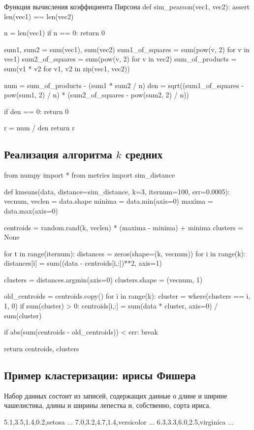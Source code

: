 \begin{pylst}{Функция вычисления коэффициента Пирсона}{}
def sim_pearson(vec1, vec2):
    assert len(vec1) == len(vec2)

    n = len(vec1)
    if n == 0:
        return 0

    sum1, sum2 = sum(vec1), sum(vec2)
    sum1_of_squares = sum(pow(v, 2) for v in vec1)
    sum2_of_squares = sum(pow(v, 2) for v in vec2)
    sum_of_products = sum(v1 * v2 for v1, v2 in zip(vec1, vec2))

    num = sum_of_products - (sum1 * sum2 / n)
    den = sqrt((sum1_of_squares - pow(sum1, 2) / n) *
               (sum2_of_squares - pow(sum2, 2) / n))

    if den == 0:
        return 0

    r = num / den
    return r
\end{pylst}

\subsection{Реализация алгоритма $k$ средних}

\begin{pylst}{}{}
from numpy import *
from metrics import sim_distance

def kmeans(data, distance=sim_distance, k=3, iternum=100, err=0.0005):
    vecnum, veclen = data.shape
    minima = data.min(axis=0)
    maxima = data.max(axis=0)

    centroids = random.rand(k, veclen) * (maxima - minima) + minima
    clusters = None

    for t in range(iternum):
        distances = zeros(shape=(k, vecnum))
        for i in range(k):
            distances[i] = sum((data - centroids[i,:])**2, axis=1)

        clusters = distances.argmin(axis=0)
        clusters.shape = (vecnum, 1)

        old_centroids = centroids.copy()
        for i in range(k):
            cluster = where(clusters == i, 1, 0)
            if sum(cluster) > 0:
                centroids[i,:] = sum(data * cluster, axis=0) / sum(cluster)

        if abs(sum(centroids - old_centroids)) < err:
            break

    return centroids, clusters
\end{pylst}

\subsection{Пример кластеризации: ирисы Фишера}
Набор данных состоит из записей, содержащих данные о длине и ширине чашелистика, длины и ширины лепестка и, собственно, сорта ириса.
\begin{plainlst}{}{}
5.1,3.5,1.4,0.2,setosa
...
7.0,3.2,4.7,1.4,versicolor
...
6.3,3.3,6.0,2.5,virginica
...
\end{plainlst}

